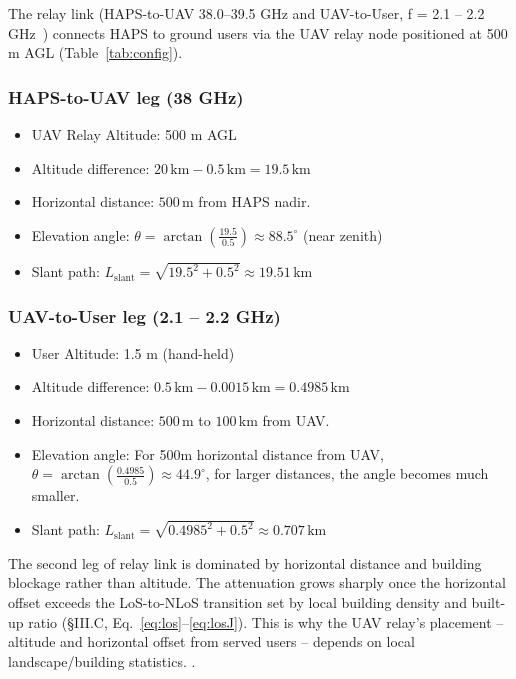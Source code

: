 \documentclass[conference]{IEEEtran}
\begin{document}
The relay link (HAPS-to-UAV 38.0–39.5 GHz and UAV-to-User, f = 2.1 -- 2.2 GHz~\cite{itu_m2101}) connects HAPS to ground users via the UAV relay node positioned at
500 m AGL (Table~\ref{tab:config}).
\subsubsection{HAPS-to-UAV leg (38 GHz)}
\begin{itemize}
  \item UAV Relay Altitude: 500 m AGL  
  \item Altitude difference: $20\,\mathrm{km} - 0.5\,\mathrm{km} = 19.5\,\mathrm{km}$
  \item Horizontal distance: $500\,\mathrm{m}$ from HAPS nadir.
  \item Elevation angle: $\theta = \arctan\left(\frac{19.5}{0.5}\right) \approx 88.5^\circ$ (near zenith)
  \item Slant path: $L_{\text{slant}} = \sqrt{19.5^2 + 0.5^2} \approx 19.51\,\mathrm{km}$
\end{itemize}

\subsubsection{UAV-to-User leg (2.1 -- 2.2 GHz)}
\begin{itemize}
  \item User Altitude: 1.5 m (hand-held)  
  \item Altitude difference: $0.5\,\mathrm{km} - 0.0015\,\mathrm{km} = 0.4985\,\mathrm{km}$
  \item Horizontal distance: $500\,\mathrm{m}$ to $100\,\mathrm{km}$ from UAV.
  \item Elevation angle: For 500m horizontal distance from UAV, $\theta = \arctan\left(\frac{0.4985}{0.5}\right) \approx 44.9^\circ$, for larger distances, the angle becomes much smaller.
  \item Slant path: $L_{\text{slant}} = \sqrt{0.4985^2 + 0.5^2} \approx 0.707\,\mathrm{km}$
\end{itemize}

The second leg of relay link is dominated by
horizontal distance and building blockage rather than altitude. The attenuation grows sharply once
the horizontal offset exceeds the LoS-to-NLoS transition set by local building density and
built-up ratio (\S III.C, Eq.~\eqref{eq:los}--\eqref{eq:losJ}). This is why the UAV relay's
placement -- altitude and horizontal offset from served users -- depends on local landscape/building statistics. .
\end{document}

